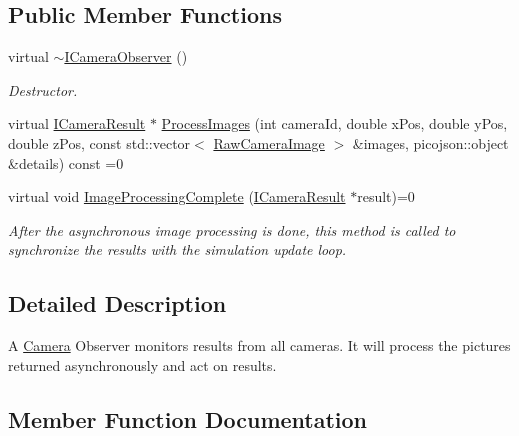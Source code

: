 \subsection*{Public Member Functions}
\begin{DoxyCompactItemize}
\item 
\mbox{\label{classICameraObserver_a19344cb93ca790a0311c9c7bcc6e8eec}} 
virtual \hyperlink{classICameraObserver_a19344cb93ca790a0311c9c7bcc6e8eec}{$\sim$\+I\+Camera\+Observer} ()
\begin{DoxyCompactList}\small\item\em Destructor. \end{DoxyCompactList}\item 
virtual \hyperlink{classICameraResult}{I\+Camera\+Result} $\ast$ \hyperlink{classICameraObserver_aec871459f2c429b4334769021b72ec34}{Process\+Images} (int camera\+Id, double x\+Pos, double y\+Pos, double z\+Pos, const std\+::vector$<$ \hyperlink{structRawCameraImage}{Raw\+Camera\+Image} $>$ \&images, picojson\+::object \&details) const =0
\item 
\mbox{\label{classICameraObserver_a7d261bd08d570d05032e61b2d5252c88}} 
virtual void \hyperlink{classICameraObserver_a7d261bd08d570d05032e61b2d5252c88}{Image\+Processing\+Complete} (\hyperlink{classICameraResult}{I\+Camera\+Result} $\ast$result)=0
\begin{DoxyCompactList}\small\item\em After the asynchronous image processing is done, this method is called to synchronize the results with the simulation update loop. \end{DoxyCompactList}\end{DoxyCompactItemize}


\subsection{Detailed Description}
A \hyperlink{classCamera}{Camera} Observer monitors results from all cameras. It will process the pictures returned asynchronously and act on results. 

\subsection{Member Function Documentation}
\mbox{\label{classICameraObserver_aec871459f2c429b4334769021b72ec34}} 
